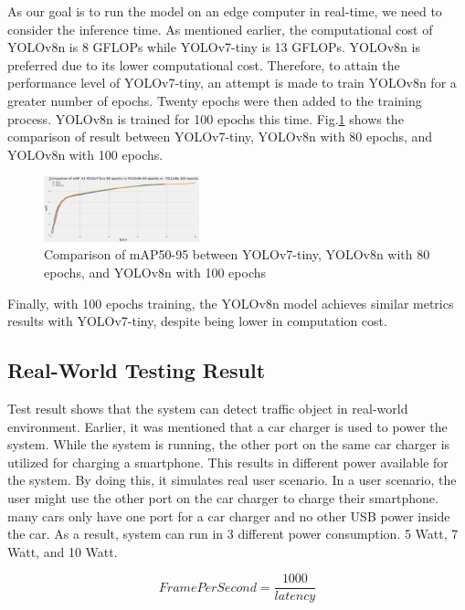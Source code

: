 \documentclass[conference]{IEEEtran}
\begin{document}
As our goal is to run the model on an edge computer in real-time, we need to consider the inference time. As mentioned earlier, the computational cost of YOLOv8n is 8 GFLOPs while YOLOv7-tiny is 13 GFLOPs.
YOLOv8n is preferred due to its lower computational cost. Therefore, to attain the performance level of YOLOv7-tiny, an attempt is made to train YOLOv8n for a greater number of epochs.
Twenty epochs were then added to the training process. YOLOv8n is trained for 100 epochs this time. Fig.\ref{fig:YOLOv7vsYOLOv8,80,100} shows the comparison of result between YOLOv7-tiny, YOLOv8n with 80 epochs, and YOLOv8n with 100 epochs.
\begin{figure}[h!]
\centering
\includegraphics[width=0.4\textwidth,keepaspectratio]{YOLOv7vs YOLOv8,80,100.png}
\caption{Comparison of mAP50-95 between YOLOv7-tiny, YOLOv8n with 80 epochs, and YOLOv8n with 100 epochs}
\label{fig:YOLOv7vsYOLOv8,80,100}
\end{figure}
Finally, with 100 epochs training, the YOLOv8n model achieves similar metrics results with YOLOv7-tiny, despite being lower in computation cost.

\subsection{Real-World Testing Result}
Test result shows that the system can detect traffic object in real-world  environment.
Earlier, it was mentioned that a car charger is used to power the system. While the system is running, the other port on the same car charger is utilized for charging a smartphone. This results in different power available for the system.
By doing this, it simulates real user scenario. In a user scenario, the user might use the other port on the car charger to charge their smartphone. many cars only have one port for a car charger and no other USB power inside the car.
As a result, system can run in 3 different power consumption. 5 Watt, 7 Watt, and 10 Watt.

\begin{equation}\label{FPS}
    Frame Per Second = \frac{1000}{latency}
\end{equation}
\end{document}
